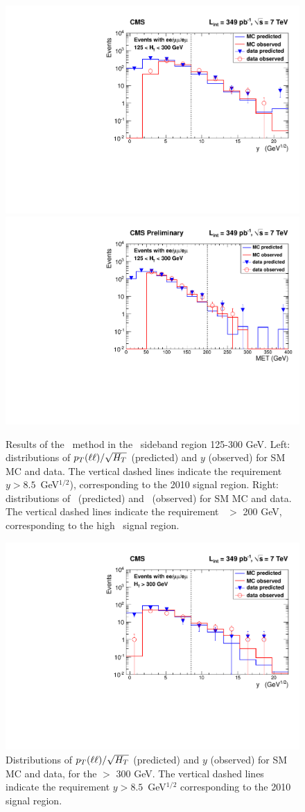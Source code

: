 \begin{figure}[hbt]
\begin{center}
\includegraphics[width=0.48\linewidth]{plots/victory_y_control_349pb.pdf}
\includegraphics[width=0.48\linewidth]{plots/victory_met200_control_349pb.pdf}
\caption{\label{fig:victorycontrol}\protect 
Results of the \ptll\ method in the \Ht\ sideband region 125-300 GeV.
Left:  distributions of $p_T(\ell\ell)/\sqrt{H_T}$ (predicted) and $y$ (observed) for 
SM MC and data. The vertical dashed lines indicate the requirement $y > 8.5$~GeV$^{1/2}$),
corresponding to the 2010 signal region.
Right: distributions of \ptll\ (predicted) and \met\ (observed) for 
SM MC and data. The vertical dashed lines indicate the requirement \met\ $>$ 200 GeV,
corresponding to the high \Ht\ signal region.
}
\end{center}
\end{figure}


\begin{figure}[tbh]
\begin{center}
\includegraphics[width=0.6\linewidth]{plots/victory_y_ht300_349pb.pdf}
\caption{\label{fig:vic1}\protect 
Distributions of $p_T(\ell\ell)/\sqrt{H_T}$ (predicted) and $y$ (observed) for 
SM MC and data, for the \Ht $>$ 300 GeV. 
The vertical dashed lines indicate the requirement $y > 8.5$~GeV$^{1/2}$ corresponding to the 2010 signal region.
}
\end{center}
\end{figure}

